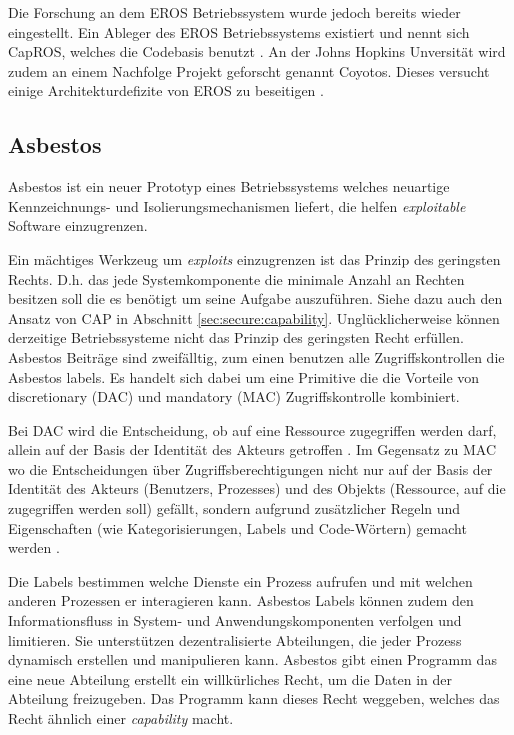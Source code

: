 \documentclass[11pt,technote]{IEEEtran}
\begin{document}
      Die Forschung an dem EROS Betriebssystem wurde jedoch bereits wieder eingestellt. Ein Ableger des EROS Betriebssystems
      existiert und nennt sich CapROS, welches die Codebasis benutzt \cite{Url:capros}. An der Johns Hopkins Unversit\"at wird zudem an einem 
      Nachfolge Projekt geforscht genannt Coyotos. Dieses versucht einige Architekturdefizite von EROS zu beseitigen \cite{Url:coyotos}.
      
    \subsection{Asbestos}        
      Asbestos ist ein neuer Prototyp eines Betriebssystems welches neuartige Kennzeichnungs- und Isolierungsmechanismen 
      liefert, die helfen \textit{exploitable} Software einzugrenzen.

      Ein m\"achtiges Werkzeug um \textit{exploits} einzugrenzen ist das Prinzip des geringsten Rechts.
      D.h. das jede Systemkomponente die minimale Anzahl an Rechten besitzen soll die es ben\"otigt um seine Aufgabe auszuf\"uhren.
      Siehe dazu auch den Ansatz von CAP in Abschnitt \ref{sec:secure:capability}. Ungl\"ucklicherweise k\"onnen derzeitige Betriebssysteme 
      nicht das Prinzip des geringsten Recht erf\"ullen. Asbestos Beitr\"age sind zweif\"alltig, zum einen benutzen alle Zugriffskontrollen die Asbestos labels. 
      Es handelt sich dabei um eine Primitive die die Vorteile von discretionary (DAC) und mandatory (MAC) Zugriffskontrolle kombiniert.
      
      Bei DAC wird die Entscheidung, ob auf eine Ressource zugegriffen werden darf, allein auf der Basis der Identität des Akteurs getroffen \cite{Url:dac}.      
      Im Gegensatz zu MAC wo die Entscheidungen über Zugriffsberechtigungen nicht nur auf der Basis der Identität des Akteurs 
      (Benutzers, Prozesses) und des Objekts (Ressource, auf die zugegriffen     
      werden soll) gefällt, sondern aufgrund zusätzlicher Regeln und Eigenschaften (wie Kategorisierungen, Labels und Code-Wörtern) gemacht werden \cite{Url:mac}.
      
      Die Labels bestimmen welche Dienste ein Prozess aufrufen und mit welchen anderen Prozessen er interagieren kann. 
      Asbestos Labels k\"onnen zudem den Informationsfluss in System- und Anwendungskomponenten verfolgen und limitieren.
      Sie unterst\"utzen dezentralisierte Abteilungen, die jeder Prozess dynamisch erstellen und manipulieren kann.
      Asbestos gibt einen Programm das eine neue Abteilung erstellt ein willk\"urliches Recht, um die Daten in der Abteilung freizugeben.
      Das Programm kann dieses Recht weggeben, welches das Recht \"ahnlich einer \textit{capability} macht.
      
\end{document}
